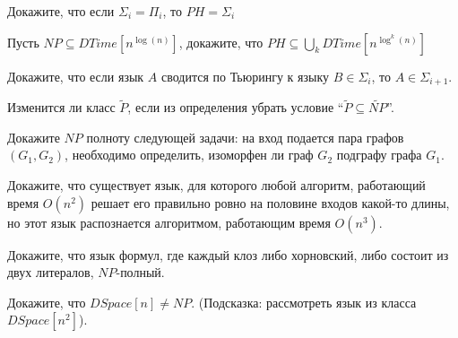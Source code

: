 \setcounter{curtask}{40}


\begin{task}
    Докажите, что если $\Sigma_i = \Pi_i$, то $PH = \Sigma_i$
\end{task}

\begin{task}
    Пусть $NP \subseteq DTime[n^{\log(n)}]$, докажите, что $PH \subseteq \bigcup\limits_{k}DTime[n^{\log^k(n)}]$
\end{task}

\begin{task}
    Докажите, что если язык $A$ сводится по Тьюрингу к языку $B \in \Sigma_{i}$, то
    $A \in \Sigma_{i + 1}$.
\end{task}

\breakline

\begin{ptask}{30}
    Изменится ли класс $\widetilde{P}$, если из определения убрать условие
    ``$\widetilde{P} \subseteq \widetilde{NP}$''.
\end{ptask}

\begin{ptask}{31}
    Докажите $NP$ полноту следующей задачи:
    на вход подается пара графов $(G_1, G_2)$, необходимо определить, изоморфен ли
    граф $G_2$ подграфу графа $G_1$.
\end{ptask}

\begin{ptask}{36}
    Докажите, что существует язык, для которого любой алгоритм, работающий время
    $O(n^2)$ решает его правильно ровно на половине входов какой-то длины, но
    этот язык распознается алгоритмом, работающим время $O(n^3)$.
\end{ptask}

\begin{ptask}{37}
	Докажите, что язык формул, где каждый клоз либо хорновский, либо состоит из двух
    литералов, $NP$-полный.
\end{ptask}

\begin{ptask}{38}
    Докажите, что $DSpace[n] \ne NP$.
    (Подсказка: рассмотреть язык из класса $DSpace[n^2]$).
\end{ptask}